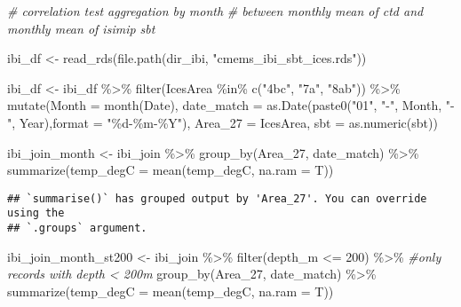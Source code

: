 \documentclass[
]{article}
\newenvironment{Shaded}{\begin{snugshade}}{\end{snugshade}}
\newcommand{\AttributeTok}[1]{\textcolor[rgb]{0.77,0.63,0.00}{#1}}
\newcommand{\CommentTok}[1]{\textcolor[rgb]{0.56,0.35,0.01}{\textit{#1}}}
\newcommand{\DecValTok}[1]{\textcolor[rgb]{0.00,0.00,0.81}{#1}}
\newcommand{\FunctionTok}[1]{\textcolor[rgb]{0.00,0.00,0.00}{#1}}
\newcommand{\NormalTok}[1]{#1}
\newcommand{\OtherTok}[1]{\textcolor[rgb]{0.56,0.35,0.01}{#1}}
\newcommand{\SpecialCharTok}[1]{\textcolor[rgb]{0.00,0.00,0.00}{#1}}
\newcommand{\StringTok}[1]{\textcolor[rgb]{0.31,0.60,0.02}{#1}}
\begin{document}
\begin{Shaded}
\begin{Highlighting}[]
\CommentTok{\# correlation test aggregation by month}
\CommentTok{\# between monthly mean of ctd and monthly mean of isimip sbt}

\NormalTok{ibi\_df }\OtherTok{\textless{}{-}} \FunctionTok{read\_rds}\NormalTok{(}\FunctionTok{file.path}\NormalTok{(dir\_ibi, }\StringTok{"cmems\_ibi\_sbt\_ices.rds"}\NormalTok{))}

\NormalTok{ibi\_df }\OtherTok{\textless{}{-}}\NormalTok{ ibi\_df }\SpecialCharTok{\%\textgreater{}\%}
  \FunctionTok{filter}\NormalTok{(IcesArea }\SpecialCharTok{\%in\%} \FunctionTok{c}\NormalTok{(}\StringTok{"4bc"}\NormalTok{, }\StringTok{"7a"}\NormalTok{, }\StringTok{"8ab"}\NormalTok{)) }\SpecialCharTok{\%\textgreater{}\%}
  \FunctionTok{mutate}\NormalTok{(}\AttributeTok{Month =} \FunctionTok{month}\NormalTok{(Date),}
         \AttributeTok{date\_match =} \FunctionTok{as.Date}\NormalTok{(}\FunctionTok{paste0}\NormalTok{(}\StringTok{"01"}\NormalTok{, }\StringTok{"{-}"}\NormalTok{, Month, }\StringTok{"{-}"}\NormalTok{, Year),}\AttributeTok{format =} \StringTok{"\%d{-}\%m{-}\%Y"}\NormalTok{), }
         \AttributeTok{Area\_27 =}\NormalTok{ IcesArea,}
         \AttributeTok{sbt =} \FunctionTok{as.numeric}\NormalTok{(sbt)) }

\NormalTok{ibi\_join\_month }\OtherTok{\textless{}{-}}\NormalTok{ ibi\_join }\SpecialCharTok{\%\textgreater{}\%} 
  \FunctionTok{group\_by}\NormalTok{(Area\_27, date\_match) }\SpecialCharTok{\%\textgreater{}\%} 
  \FunctionTok{summarize}\NormalTok{(}\AttributeTok{temp\_degC =} \FunctionTok{mean}\NormalTok{(temp\_degC, }\AttributeTok{na.ram =}\NormalTok{ T))}
\end{Highlighting}
\end{Shaded}

\begin{verbatim}
## `summarise()` has grouped output by 'Area_27'. You can override using the
## `.groups` argument.
\end{verbatim}

\begin{Shaded}
\begin{Highlighting}[]
\NormalTok{ibi\_join\_month\_st200 }\OtherTok{\textless{}{-}}\NormalTok{ ibi\_join }\SpecialCharTok{\%\textgreater{}\%} 
  \FunctionTok{filter}\NormalTok{(depth\_m }\SpecialCharTok{\textless{}=} \DecValTok{200}\NormalTok{) }\SpecialCharTok{\%\textgreater{}\%} \CommentTok{\#only records with depth \textless{} 200m}
  \FunctionTok{group\_by}\NormalTok{(Area\_27, date\_match) }\SpecialCharTok{\%\textgreater{}\%} 
  \FunctionTok{summarize}\NormalTok{(}\AttributeTok{temp\_degC =} \FunctionTok{mean}\NormalTok{(temp\_degC, }\AttributeTok{na.ram =}\NormalTok{ T))}
\end{Highlighting}
\end{Shaded}
\end{document}
